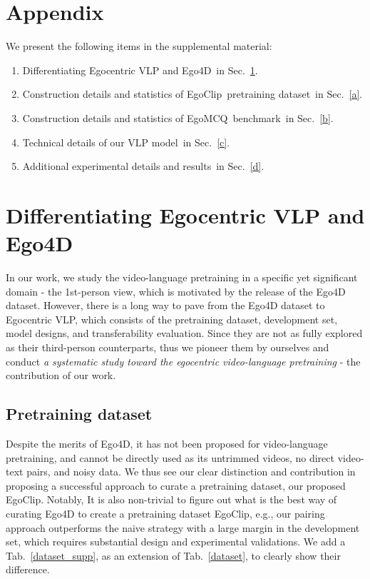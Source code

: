 \documentclass{article}
\newcommand{\dataset}{EgoClip}
\newcommand{\eval}{EgoMCQ}
\begin{document}



\newcommand{\secf}{Differentiating Egocentric VLP and Ego4D}
\newcommand{\seca}{Construction details and statistics of \dataset~pretraining dataset}
\newcommand{\secb}{Construction details and statistics of \eval~benchmark}
\newcommand{\secc}{Technical details of our VLP model}
\newcommand{\secd}{Additional experimental details and results}

\newpage
\section*{Appendix}
We present the following items in the supplemental material:

\begin{enumerate}[label=\textbf{\Alph*}.]
    \item \secf~in Sec.~\ref{f}.
    \item \seca~in Sec.~\ref{a}.
    \item \secb~in Sec.~\ref{b}.
    \item \secc~in Sec.~\ref{c}.
    \item \secd~in Sec.~\ref{d}.
\end{enumerate}

\renewcommand\thesection{\Alph{section}}
\setcounter{section}{0}
\section{\secf}\label{f}
In our work, we study the video-language pretraining in a specific yet significant domain - the 1st-person view, which is motivated by the release of the Ego4D dataset. However, there is a long way to pave from the Ego4D dataset to Egocentric VLP, which consists of the pretraining dataset, development set, model designs, and transferability evaluation. Since they are not as fully explored as their third-person counterparts, thus we pioneer them by ourselves and conduct \textit{a systematic study toward the egocentric video-language pretraining} - the contribution of our work.

\subsection{Pretraining dataset}
Despite the merits of Ego4D, it has not been proposed for video-language pretraining, and cannot be directly used as its untrimmed videos, no direct video-text pairs, and noisy data. We thus see our clear distinction and contribution in proposing a successful approach to curate a pretraining dataset, our proposed EgoClip. Notably, It is also non-trivial to figure out what is the best way of curating Ego4D to create a pretraining dataset EgoClip, e.g., our pairing approach outperforms the naive strategy with a large margin in the development set, which requires substantial design and experimental validations. We add a Tab.~\ref{dataset_supp}, as an extension of Tab.~\ref{dataset}, to clearly show their difference.
\end{document}
